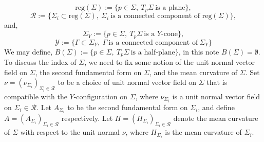 \documentclass[11pt]{amsart}
\numberwithin{equation}{section}
\theoremstyle{theorem}
\theoremstyle{definition}
\numberwithin{equation}{section}
\begin{document}
$$
\text{reg}(\Sigma):=\{p\in \Sigma,\ T_p\Sigma \ \text{is a plane}\},    
$$
$$
 \mathcal{R}:=\{ \Sigma_i\subset \text{reg}(\Sigma),\ \Sigma_i\ \text{is a connected component of reg}(\Sigma)\}, 
$$
and,
$$
\Sigma_Y:=\{ p\in \Sigma,\ T_p\Sigma \ \text{is a $Y$-cone}\},   
$$
$$
\mathcal{Y}:=\{ \Gamma \subset \Sigma_Y,\  \Gamma \ \text{is a connected component of}\ \Sigma_Y\}
$$
We may define, $B(\Sigma):=\{ p\in \Sigma,\ T_p\Sigma \ \text{is a half-plane}\}$, in this note $B(\Sigma)=\emptyset$.
To discuss the index of $\Sigma$, we need to fix some notion of the unit normal vector field on $\Sigma$, the second fundamental form on $\Sigma$, and the mean curvature of $\Sigma$. Set $\nu=(\nu_{\Sigma_i})_{\Sigma_i\in \mathcal{R}}$ to be a choice of unit normal vector field on $\Sigma$ that is compatible with the $Y$-configuration on $\Sigma$, where $\nu_{\Sigma_i}$ is a unit normal vector field on $\Sigma_i \in \mathcal{R}$. Let $A_{\Sigma_i}$ to be the second fundamental form on $\Sigma_i$, and define $A=(A_{\Sigma_i})_{\Sigma_i\in \mathcal{R}}$ respectively. Let $H=(H_{\Sigma_i})_{\Sigma_i\in \mathcal{R}}$ denote the mean curvature of $\Sigma$ with respect to the unit normal $\nu$, where $H_{\Sigma_i}$ is the mean curvature of $\Sigma_i$.
\medskip
\end{document}
